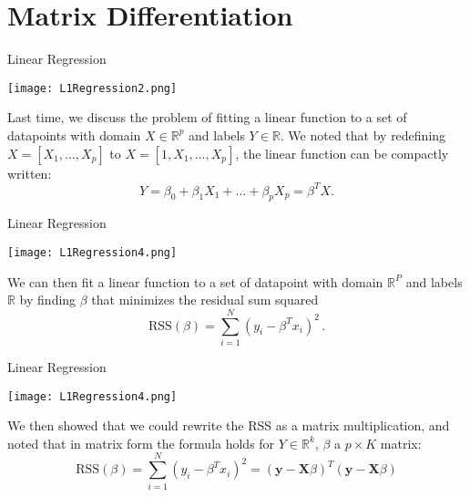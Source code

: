 \documentclass[10pt,handout]{beamer}
\begin{document}
\section{Matrix Differentiation} %

\begin{frame}[fragile]{Linear Regression}
  \begin{minipage}[t][0.5\textheight][t]{\textwidth}
    \centering
     \texttt{[image: L1Regression2.png]}
  \end{minipage}
  \vfill
  \begin{minipage}[t][0.5\textheight][t]{\textwidth}
Last time, we discuss the problem of fitting a linear function to a set of datapoints with domain $X\in \mathbb{R}^p$ and labels $Y\in \mathbb{R}$. We noted that by redefining $X = [X_1, \ldots, X_p]$ to $X = [1, X_1, \ldots, X_p]$, the linear function can be compactly written:
$$
Y = \beta_0 + \beta_1 X_1 + \ldots + \beta_p X_p = \beta^TX. 
$$
  \end{minipage}
\end{frame}



\begin{frame}[fragile]{Linear Regression}
  \begin{minipage}[t][0.5\textheight][t]{\textwidth}
    \centering
     \texttt{[image: L1Regression4.png]}
  \end{minipage}
  \vfill
  \begin{minipage}[t][0.5\textheight][t]{\textwidth}
We can then fit a linear function to a set of datapoint with domain $\mathbb{R}^P$ and labels $\mathbb{R}$ by finding $\beta$ that minimizes the residual sum squared
$$
\text{RSS}(\beta) = \sum_{i=1}^N(y_i - \beta^T x_i)^2\,.
$$
  \end{minipage}
\end{frame}


\begin{frame}[fragile]{Linear Regression}
  \begin{minipage}[t][0.5\textheight][t]{\textwidth}
    \centering
     \texttt{[image: L1Regression4.png]}
  \end{minipage}
  \vfill
  \begin{minipage}[t][0.5\textheight][t]{\textwidth}
We then showed that we could rewrite the RSS as a matrix multiplication, and noted that in matrix form the formula holds for $Y\in \mathbb{R}^k$, $\beta$ a $p\times K$ matrix:
$$
\text{RSS}(\beta) = \sum_{i=1}^N(y_i - \beta^T x_i)^2 = (\mathbf{y} - \mathbf{X}\beta)^T(\mathbf{y} - \mathbf{X}\beta)
$$
  \end{minipage}
\end{frame}
\end{document}
